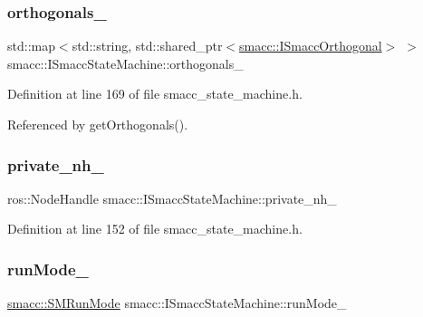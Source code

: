 \subsubsection{\texorpdfstring{orthogonals\+\_\+}{orthogonals\_}}
{\footnotesize\ttfamily std\+::map$<$std\+::string, std\+::shared\+\_\+ptr$<$\hyperlink{classsmacc_1_1ISmaccOrthogonal}{smacc\+::\+I\+Smacc\+Orthogonal}$>$ $>$ smacc\+::\+I\+Smacc\+State\+Machine\+::orthogonals\+\_\+\hspace{0.3cm}{\ttfamily [protected]}}



Definition at line 169 of file smacc\+\_\+state\+\_\+machine.\+h.



Referenced by get\+Orthogonals().

\mbox{\label{classsmacc_1_1ISmaccStateMachine_a9c6a5c647ecca6599589c12fdcd53bfc}} 
\subsubsection{\texorpdfstring{private\+\_\+nh\+\_\+}{private\_nh\_}}
{\footnotesize\ttfamily ros\+::\+Node\+Handle smacc\+::\+I\+Smacc\+State\+Machine\+::private\+\_\+nh\+\_\+\hspace{0.3cm}{\ttfamily [protected]}}



Definition at line 152 of file smacc\+\_\+state\+\_\+machine.\+h.

\mbox{\label{classsmacc_1_1ISmaccStateMachine_a9f8cfbf577f7ae7a48b7a328e2e6b589}} 
\subsubsection{\texorpdfstring{run\+Mode\+\_\+}{runMode\_}}
{\footnotesize\ttfamily \hyperlink{namespacesmacc_a3e4f79486ea6ea6342dd3c712d16a4f6}{smacc\+::\+S\+M\+Run\+Mode} smacc\+::\+I\+Smacc\+State\+Machine\+::run\+Mode\+\_\+\hspace{0.3cm}{\ttfamily [private]}}



